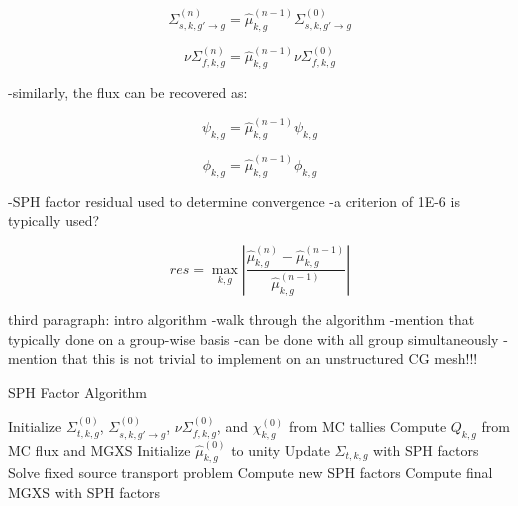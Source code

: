 \begin{dmath}
\label{eqn:chap6-sph-update-sigs}
\Sigma_{s,k,g'\rightarrow g}^{(n)} = \hat{\mu}_{k,g}^{(n-1)}\Sigma_{s,k,g'\rightarrow g}^{(0)}
\end{dmath}

\begin{dmath}
\label{eqn:chap6-sph-update-nusigf}
\nu\Sigma_{f,k,g}^{(n)} = \hat{\mu}_{k,g}^{(n-1)}\nu\Sigma_{f,k,g}^{(0)}
\end{dmath}

-similarly, the flux can be recovered as:

\begin{dmath}
\label{eqn:chap6-sph-update-angular-flux}
\psi_{k,g} = \hat{\mu}_{k,g}^{(n-1)}\psi_{k,g}
\end{dmath}

\begin{dmath}
\label{eqn:chap6-sph-update-scalar-flux}
\phi_{k,g} = \hat{\mu}_{k,g}^{(n-1)}\phi_{k,g}
\end{dmath}

-SPH factor residual used to determine convergence
-a criterion of 1E-6 is typically used?

\begin{dmath}
\label{eqn:chap6-sph-residual}
res = \max_{k,g} \left|\frac{\hat{\mu}_{k,g}^{(n)} - \hat{\mu}_{k,g}^{(n-1)}}{\hat{\mu}_{k,g}^{(n-1)}}\right|
\end{dmath}

third paragraph: intro algorithm
-walk through the algorithm
-mention that typically done on a group-wise basis
-can be done with all group simultaneously
-mention that this is not trivial to implement on an unstructured \ac{CG} mesh!!!

\begin{algorithm}[h]
\caption{SPH Factor Algorithm}
\label{alg:chap6-sph}
\begin{algorithmic}[1]
  \State Initialize $\Sigma_{t,k,g}^{(0)}$, $\Sigma_{s,k,g'\rightarrow g}^{(0)}$, $\nu\Sigma_{f,k,g}^{(0)}$, and $\chi_{k,g}^{(0)}$ from MC tallies 
  \State Compute $Q_{k,g}$ from MC flux and \ac{MGXS} 
  \State Initialize $\hat{\mu}_{k,g}^{(0)}$ to unity
    \State Update $\Sigma_{t,k,g}$ with \ac{SPH} factors 
    \State Solve fixed source transport problem\footnotemark {}
    \State Compute new \ac{SPH} factors 
  \EndWhile
  \State Compute final \ac{MGXS} with \ac{SPH} factors 
\end{algorithmic}
\end{algorithm}

